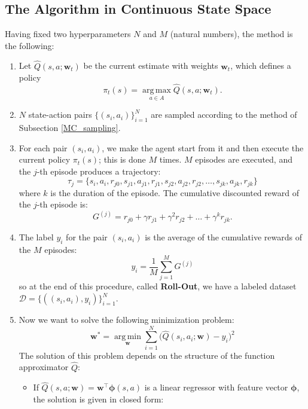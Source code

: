 \documentclass[10pt, a4paper]{report}
\begin{document}
\subsection{The Algorithm in Continuous State Space}
Having fixed two hyperparameters $N$ and $M$ (natural numbers), the method is the following:
\begin{enumerate}
    \item Let $\hat Q(s,a ; \mathbf w_t)$ be the current estimate with weights $\mathbf w_t$, which defines a policy $$\pi_t(s)=\operatorname*{arg\,max}_{a\in A}\hat Q(s,a; \mathbf w_t).$$
    \item $N$ state-action pairs $\{(s_i,a_i)\}_{i=1}^N$ are sampled according to the method of Subsection \ref{MC_sampling}.
    \item For each pair $(s_i,a_i)$, we make the agent start from it and then execute the current policy $\pi_t(s)$; this is done $M$ times. $M$ episodes are executed, and the $j$-th episode produces a trajectory:
    \begin{equation}
        \tau_j=\{s_i,a_i,r_{j0},s_{j1},a_{j1},r_{j1},
        s_{j2},a_{j2},r_{j2},\dots,s_{jk},a_{jk},r_{jk}\}
    \end{equation}
    where $k$ is the duration of the episode. The cumulative discounted reward of the $j$-th episode is:
    \begin{equation}
        G^{(j)}=r_{j0}+\gamma r_{j1} + \gamma^2r_{j2}+\dots + \gamma^kr_{jk}.
    \end{equation}
    \item The label $y_i$ for the pair $(s_i,a_i)$ is the average of the cumulative rewards of the $M$ episodes:
    \begin{equation}
        y_i = \frac{1}{M} \sum_{j=1}^M G^{(j)}
    \end{equation}
    so at the end of this procedure, called \textbf{Roll-Out}, we have a labeled dataset $\mathcal D = \{((s_i,a_i),y_i)\}_{i=1}^N$.
    \item Now we want to solve the following minimization problem:
    \begin{equation}
        \boxed{\mathbf w^*= \operatorname*{arg\,min}_{\mathbf{w}} \sum_{i=1}^N \big(\hat{Q}(s_i, a_i; \mathbf{w}) - y_i\big)^2}
    \end{equation}
    The solution of this problem depends on the structure of the function approximator $\hat Q$:
    \begin{itemize}
        \item If $\hat Q(s,a;\mathbf w)=\mathbf w^\top\boldsymbol\phi(s,a)$ is a linear regressor with feature vector $\boldsymbol\phi$, the solution is given in closed form:

\end{itemize}
\end{enumerate}
\end{document}
